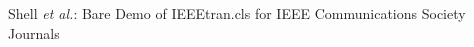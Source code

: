 \documentclass[journal,comsoc]{IEEEtran}
\begin{document}

% 

%



%
{Shell \MakeLowercase{\textit{et al.}}: Bare Demo of IEEEtran.cls for IEEE Communications Society Journals}
% 











\maketitle
\end{document}
